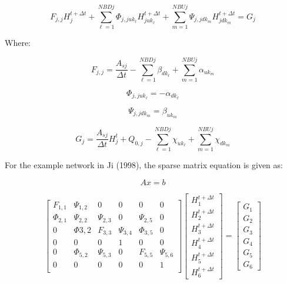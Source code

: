 \documentclass[11pt]{article}
\begin{document}
\begin{equation}
 \boxed{
 F_{j,j} H_{j}^{t + \Delta t} + \sum_{\ell=1}^{NBDj} \Phi_{j,juk_\ell} H_{juk_\ell}^{t + \Delta t} + \sum_{m=1}^{NBUj} \Psi_{j,jdk_m} H_{jdk_m}^{t + \Delta t} = G_j
 }
\end{equation}

Where:

\begin{equation}
  \boxed{
  F_{j,j} = \frac{A_{sj}}{\Delta t} - \sum_{\ell=1}^{NBDj} \beta_{dk_\ell} + \sum_{m=1}^{NBUj} \alpha_{uk_m}
  }
\end{equation}

\begin{equation}
  \boxed{
  \Phi_{j,juk_\ell} = - \alpha_{dk_\ell}
  }
\end{equation}

\begin{equation}
  \boxed{
  \Psi_{j,jdk_m} = \beta_{uk_m}
  }
\end{equation}

\begin{equation}
  \boxed{
  G_j = \frac{A_{sj}}{\Delta t} H_j^t + Q_{0,j} - \sum_{\ell=1}^{NBDj} \chi_{uk_\ell} + \sum_{m=1}^{NBUj} \chi_{dk_m}
  }
\end{equation}

For the example network in Ji (1998), the sparse matrix equation is given as:

\begin{equation}
  A x = b
\end{equation}

\begin{equation}
  \begin{bmatrix}
   F_{1,1} & \Psi_{1,2} & 0 & 0 & 0 & 0 \\
   \Phi_{2,1} & \Psi_{2,2} & \Psi_{2,3} & 0 & \Psi_{2,5} & 0 \\
   0 & \Phi{3,2} & F_{3,3} & \Psi_{3,4} & \Phi_{3,5} & 0 \\
   0 & 0 & 0 & 1 & 0 & 0 \\
   0 & \Phi_{5,2} & \Psi_{5,3} & 0 & F_{5,5} & \Psi_{5,6} \\
   0 & 0 & 0 & 0 & 0 & 1 \\
  \end{bmatrix}
  \begin{bmatrix}
    H_{1}^{t + \Delta t} \\ H_{2}^{t + \Delta t} \\ H_{3}^{t + \Delta t} \\ H_{4}^{t + \Delta t} \\
    H_{5}^{t + \Delta t} \\ H_{6}^{t + \Delta t}
  \end{bmatrix}
  =
  \begin{bmatrix}
   G_1 \\ G_2 \\ G_3 \\ G_4 \\ G_5 \\ G_6 
  \end{bmatrix}
\end{equation}
\end{document}
